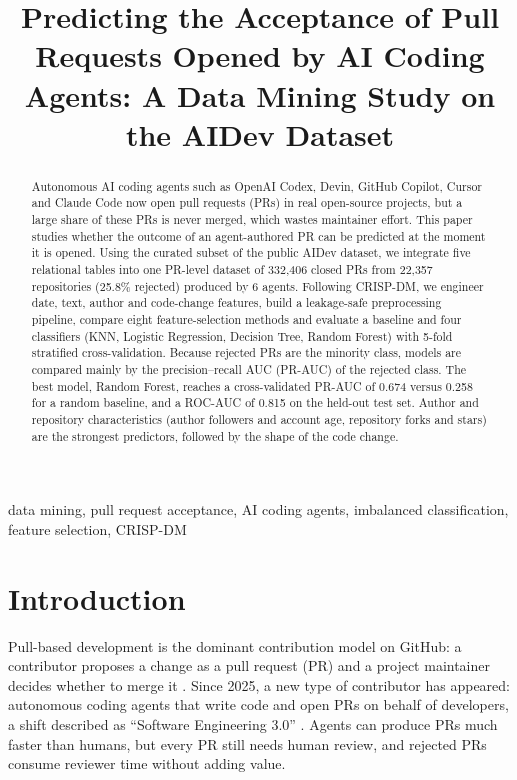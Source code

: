 \documentclass[conference]{IEEEtran}
\begin{document}
\title{Predicting the Acceptance of Pull Requests Opened by AI Coding Agents: A Data Mining Study on the AIDev Dataset}

\author{
}

\maketitle

\begin{abstract}
Autonomous AI coding agents such as OpenAI Codex, Devin, GitHub Copilot, Cursor and Claude Code now open pull requests (PRs) in real open-source projects, but a large share of these PRs is never merged, which wastes maintainer effort. This paper studies whether the outcome of an agent-authored PR can be predicted at the moment it is opened. Using the curated subset of the public AIDev dataset, we integrate five relational tables into one PR-level dataset of 332,406 closed PRs from 22,357 repositories (25.8\% rejected) produced by 6 agents. Following CRISP-DM, we engineer date, text, author and code-change features, build a leakage-safe preprocessing pipeline, compare eight feature-selection methods and evaluate a baseline and four classifiers (KNN, Logistic Regression, Decision Tree, Random Forest) with 5-fold stratified cross-validation. Because rejected PRs are the minority class, models are compared mainly by the precision--recall AUC (PR-AUC) of the rejected class. The best model, Random Forest, reaches a cross-validated PR-AUC of 0.674 versus 0.258 for a random baseline, and a ROC-AUC of 0.815 on the held-out test set. Author and repository characteristics (author followers and account age, repository forks and stars) are the strongest predictors, followed by the shape of the code change.
\end{abstract}

\begin{IEEEkeywords}
data mining, pull request acceptance, AI coding agents, imbalanced classification, feature selection, CRISP-DM
\end{IEEEkeywords}

\section{Introduction}
Pull-based development is the dominant contribution model on GitHub: a contributor proposes a change as a pull request (PR) and a project maintainer decides whether to merge it \cite{gousios2014exploratory}. Since 2025, a new type of contributor has appeared: autonomous coding agents that write code and open PRs on behalf of developers, a shift described as ``Software Engineering 3.0'' \cite{li2025rise}. Agents can produce PRs much faster than humans, but every PR still needs human review, and rejected PRs consume reviewer time without adding value.
\end{document}
